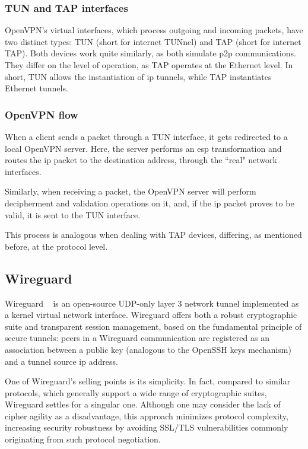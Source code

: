 \documentclass[11pt,twoside,a4paper]{report}
\begin{document}
\subsubsection{TUN and TAP interfaces}

OpenVPN's virtual interfaces, which process outgoing and incoming packets, have two distinct types: TUN (short for internet TUNnel) and TAP (short for internet TAP). Both devices work quite similarly, as both simulate \ac{p2p} communications. They differ on the level of operation, as TAP operates at the Ethernet level. In short, TUN allows the instantiation of \ac{ip} tunnels, while TAP instantiates Ethernet tunnels.

\subsubsection{OpenVPN flow}

When a client sends a packet through a TUN interface, it gets redirected to a local OpenVPN server. Here, the server performs an \ac{esp} transformation and routes the \ac{ip} packet to the destination address, through the ``real" network interfaces.

Similarly, when receiving a packet, the OpenVPN server will perform decipherment and validation operations on it, and, if the \ac{ip} packet proves to be valid, it is sent to the TUN interface.

This process is analogous when dealing with TAP devices, differing, as mentioned before, at the protocol level.

\subsection{Wireguard}

Wireguard ~\cite{donenfeld2017wireguard} is an open-source UDP-only layer 3 network tunnel implemented as a kernel virtual network interface. Wireguard offers both a robust cryptographic suite and transparent session management, based on the fundamental principle of secure tunnels: peers in a Wireguard communication are registered as an association between a public key (analogous to the OpenSSH keys mechanism) and a tunnel source \ac{ip} address.

One of Wireguard's selling points is its simplicity. In fact, compared to similar protocols, which generally support a wide range of cryptographic suites, Wireguard settles for a singular one. Although one may consider the lack of cipher agility as a disadvantage, this approach minimizes protocol complexity, increasing security robustness by avoiding SSL/TLS vulnerabilities commonly originating from such protocol negotiation.
\end{document}
